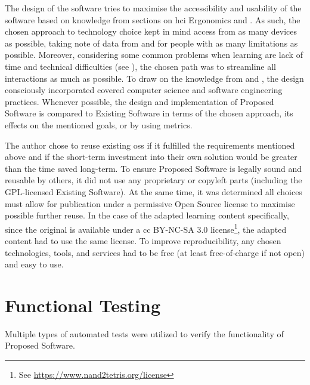 The design of the software tries to maximise the accessibility and usability of the software based on knowledge from sections on \gls{hci} Ergonomics  and .
As such, the chosen approach to technology choice kept in mind access from as many devices as possible, taking note of data from  and for people with as many limitations as possible.
Moreover, considering some common problems when learning are lack of time and technical difficulties (see ), the chosen path was to streamline all interactions as much as possible.
To draw on the knowledge from  and , the design consciously incorporated covered computer science and software engineering practices.
Whenever possible, the design and implementation of Proposed Software is compared to Existing Software in terms of the chosen approach, its effects on the mentioned goals, or by using metrics.

The author chose to reuse existing \gls{oss} if it fulfilled the requirements mentioned above and if the short-term investment into their own solution would be greater than the time saved long-term.
To ensure Proposed Software is legally sound and reusable by others, it did not use any proprietary or copyleft parts (including the GPL-licensed Existing Software).
At the same time, it was determined all choices must allow for publication under a permissive Open Source license to maximise possible further reuse.
In the case of the adapted learning content specifically, since the original is available under a \gls{cc} BY-NC-SA 3.0 license\footnote{See \url{https://www.nand2tetris.org/license}}, the adapted content had to use the same license.
To improve reproducibility, any chosen technologies, tools, and services had to be free (at least free-of-charge if not open) and easy to use.

\section{Functional Testing}

Multiple types of automated tests were utilized to verify the functionality of Proposed Software.

